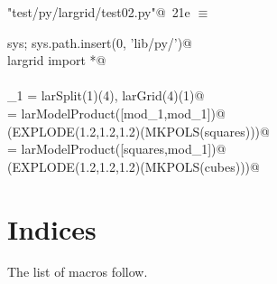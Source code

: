 \documentclass[11pt,oneside]{article}	%
\begin{document}
\begin{flushleft} \small \label{scrap36}
\protect{}\verb@"test/py/largrid/test02.py"@\nobreak\ {\footnotesize 21e }$\equiv$
\vspace{-1ex}
\begin{list}{}{} \item
\mbox{}\verb@import sys; sys.path.insert(0, 'lib/py/')@\\
\mbox{}\verb@from largrid import *@\\
\mbox{}\verb@@\\
\mbox{}\verb@mod_1 = larSplit(1)(4), larGrid(4)(1)@\\
\mbox{}\verb@squares = larModelProduct([mod_1,mod_1])@\\
\mbox{}\verb@VIEW(EXPLODE(1.2,1.2,1.2)(MKPOLS(squares)))@\\
\mbox{}\verb@cubes = larModelProduct([squares,mod_1])@\\
\mbox{}\verb@VIEW(EXPLODE(1.2,1.2,1.2)(MKPOLS(cubes)))@\\
\mbox{}\verb@@{\NWsep}
\end{list}
\vspace{-2ex}
\end{flushleft}


\section{Indices}
\label{sec:indices}

The list of macros follow.
\end{document}
